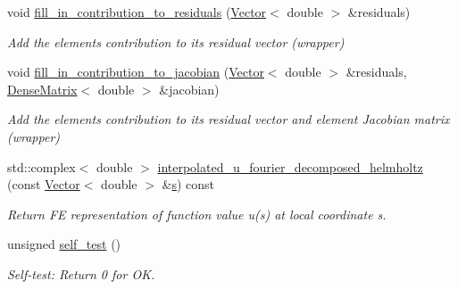 \begin{DoxyCompactItemize}
void \hyperlink{classoomph_1_1FourierDecomposedHelmholtzEquations_af8de850d46849598e0d84bec03a8ecf6}{fill\+\_\+in\+\_\+contribution\+\_\+to\+\_\+residuals} (\hyperlink{classoomph_1_1Vector}{Vector}$<$ double $>$ \&residuals)
\begin{DoxyCompactList}\small\item\em Add the element\textquotesingle{}s contribution to its residual vector (wrapper) \end{DoxyCompactList}\item 
void \hyperlink{classoomph_1_1FourierDecomposedHelmholtzEquations_a75285db2b555ba4ad1f79ed9bb3bcf03}{fill\+\_\+in\+\_\+contribution\+\_\+to\+\_\+jacobian} (\hyperlink{classoomph_1_1Vector}{Vector}$<$ double $>$ \&residuals, \hyperlink{classoomph_1_1DenseMatrix}{Dense\+Matrix}$<$ double $>$ \&jacobian)
\begin{DoxyCompactList}\small\item\em Add the element\textquotesingle{}s contribution to its residual vector and element Jacobian matrix (wrapper) \end{DoxyCompactList}\item 
std\+::complex$<$ double $>$ \hyperlink{classoomph_1_1FourierDecomposedHelmholtzEquations_ab9fa392f89380cb9244f3630353dcd2a}{interpolated\+\_\+u\+\_\+fourier\+\_\+decomposed\+\_\+helmholtz} (const \hyperlink{classoomph_1_1Vector}{Vector}$<$ double $>$ \&\hyperlink{cfortran_8h_ab7123126e4885ef647dd9c6e3807a21c}{s}) const
\begin{DoxyCompactList}\small\item\em Return FE representation of function value u(s) at local coordinate s. \end{DoxyCompactList}\item 
unsigned \hyperlink{classoomph_1_1FourierDecomposedHelmholtzEquations_a5cf034d730e1f1f87be5400d20a57031}{self\+\_\+test} ()
\begin{DoxyCompactList}\small\item\em Self-\/test\+: Return 0 for OK. \end{DoxyCompactList}\end{DoxyCompactItemize}
